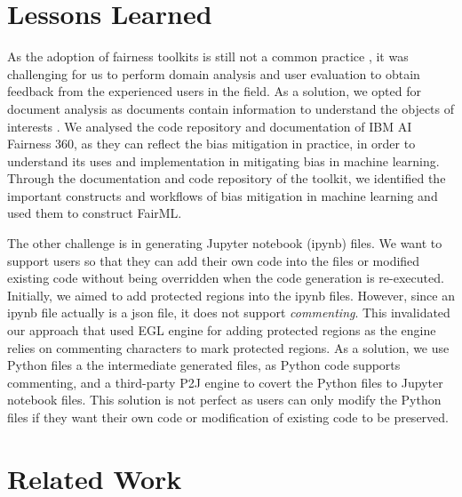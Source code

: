 \documentclass[sigconf,review]{acmart}
\begin{document}
\section{Lessons Learned}
\label{sec:lessons_learned}
As the adoption of fairness toolkits is still not a common practice \cite{lee2021landscape}, it was challenging for us to perform domain analysis and user evaluation to obtain feedback from the experienced users in the field. As a solution, we opted for document analysis as documents contain information to understand the objects of interests \cite{bowen2009document}. We analysed the code repository and documentation of IBM AI Fairness 360, as they can reflect the bias mitigation in practice, in order to understand its uses and implementation in mitigating bias in machine learning. Through the documentation and code repository of the toolkit, we identified the important constructs and workflows of bias mitigation in machine learning and used them to construct FairML.

The other challenge is in generating Jupyter notebook (ipynb) files. We want to support users so that they can add their own code into the files or modified existing code without being overridden when the code generation is re-executed. Initially, we aimed to add protected regions into the ipynb files. However, since an ipynb file actually is a json file, it does not support \textit{commenting}. This invalidated our approach that used EGL engine \cite{rose2008egl} for adding protected regions as the engine relies on commenting characters to mark protected regions. As a solution, we use Python files a the intermediate generated files, as Python code supports commenting, and a third-party P2J engine to covert the Python files to Jupyter notebook files. This solution is not perfect as users can only modify the Python files if they want their own code or modification of existing code to be preserved.

\section{Related Work}
\label{sec:related_work}
\end{document}

